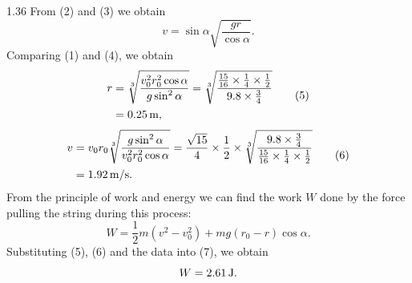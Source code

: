 \begin{solution}{1.36}
From (2) and (3) we obtain
\begin{equation}
v=\sin\alpha\sqrt{\frac{gr}{\cos\alpha}}. \tag{4}
\end{equation}
Comparing (1) and (4), we obtain
\begin{equation}
\begin{aligned}
r&=\sqrt[3]{\frac{v_0^2r_0^2\cos\alpha}{g\sin^2\alpha}}
=\sqrt[3]{\frac{\frac{15}{16}\times\frac{1}{4}\times\frac{1}{2}}{9.8\times\frac{3}{4}}}\\
&=0.25\,\mathrm{m},
\end{aligned} \tag{5}
\end{equation}
\begin{equation}
\begin{aligned}
v&=v_0r_0\sqrt[3]{\frac{g\sin^2\alpha}{v_0^2r_0^2\cos\alpha}}
=\frac{\sqrt{15}}{4}\times\frac{1}{2}\times
\sqrt[3]{\frac{9.8\times\frac{3}{4}}{\frac{15}{16}\times\frac{1}{4}\times\frac{1}{2}}}\\
&=1.92\,\mathrm{m/s}.
\end{aligned} \tag{6}
\end{equation}
From the principle of work and energy we can find the work $W$ done by the force pulling the string during this process:
\begin{equation}
W=\frac{1}{2}m(v^2-v_0^2)+mg(r_0-r)\cos\alpha. \tag{7}
\end{equation}
Substituting (5), (6) and the data into (7), we obtain
\[
W=2.61\,\mathrm{J}.
\]

\end{solution}

